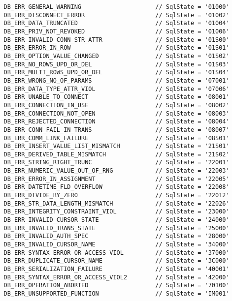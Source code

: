 
\begin{verbatim}
   DB_ERR_GENERAL_WARNING                     // SqlState = '01000'
   DB_ERR_DISCONNECT_ERROR                    // SqlState = '01002'
   DB_ERR_DATA_TRUNCATED                      // SqlState = '01004'
   DB_ERR_PRIV_NOT_REVOKED                    // SqlState = '01006'
   DB_ERR_INVALID_CONN_STR_ATTR               // SqlState = '01S00'
   DB_ERR_ERROR_IN_ROW                        // SqlState = '01S01'
   DB_ERR_OPTION_VALUE_CHANGED                // SqlState = '01S02'
   DB_ERR_NO_ROWS_UPD_OR_DEL                  // SqlState = '01S03'
   DB_ERR_MULTI_ROWS_UPD_OR_DEL               // SqlState = '01S04'
   DB_ERR_WRONG_NO_OF_PARAMS                  // SqlState = '07001'
   DB_ERR_DATA_TYPE_ATTR_VIOL                 // SqlState = '07006'
   DB_ERR_UNABLE_TO_CONNECT                   // SqlState = '08001'
   DB_ERR_CONNECTION_IN_USE                   // SqlState = '08002'
   DB_ERR_CONNECTION_NOT_OPEN                 // SqlState = '08003'
   DB_ERR_REJECTED_CONNECTION                 // SqlState = '08004'
   DB_ERR_CONN_FAIL_IN_TRANS                  // SqlState = '08007'
   DB_ERR_COMM_LINK_FAILURE                   // SqlState = '08S01'
   DB_ERR_INSERT_VALUE_LIST_MISMATCH          // SqlState = '21S01'
   DB_ERR_DERIVED_TABLE_MISMATCH              // SqlState = '21S02'
   DB_ERR_STRING_RIGHT_TRUNC                  // SqlState = '22001'
   DB_ERR_NUMERIC_VALUE_OUT_OF_RNG            // SqlState = '22003'
   DB_ERR_ERROR_IN_ASSIGNMENT                 // SqlState = '22005'
   DB_ERR_DATETIME_FLD_OVERFLOW               // SqlState = '22008'
   DB_ERR_DIVIDE_BY_ZERO                      // SqlState = '22012'
   DB_ERR_STR_DATA_LENGTH_MISMATCH            // SqlState = '22026'
   DB_ERR_INTEGRITY_CONSTRAINT_VIOL           // SqlState = '23000'
   DB_ERR_INVALID_CURSOR_STATE                // SqlState = '24000'
   DB_ERR_INVALID_TRANS_STATE                 // SqlState = '25000'
   DB_ERR_INVALID_AUTH_SPEC                   // SqlState = '28000'
   DB_ERR_INVALID_CURSOR_NAME                 // SqlState = '34000'
   DB_ERR_SYNTAX_ERROR_OR_ACCESS_VIOL         // SqlState = '37000'
   DB_ERR_DUPLICATE_CURSOR_NAME               // SqlState = '3C000'
   DB_ERR_SERIALIZATION_FAILURE               // SqlState = '40001'
   DB_ERR_SYNTAX_ERROR_OR_ACCESS_VIOL2        // SqlState = '42000'
   DB_ERR_OPERATION_ABORTED                   // SqlState = '70100'
   DB_ERR_UNSUPPORTED_FUNCTION                // SqlState = 'IM001'

\end{verbatim}
